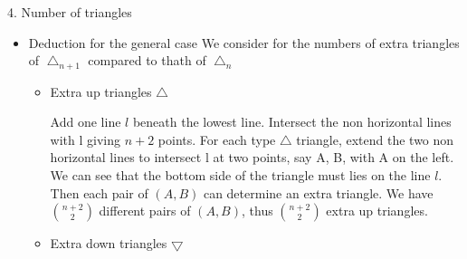 \documentclass{beamer}
\begin{document}
\begin{frame}{4. Number of triangles}
\begin{itemize}
    \item Deduction for the general case
          We consider for the numbers of extra triangles of $\bigtriangleup_{n+1}$ compared to thath of
          $\bigtriangleup_{n}$
          \begin{itemize}
           \item Extra up triangles $\bigtriangleup$
                  \begin{minipage}{0.8\linewidth}
                    Add one line $l$ beneath the lowest line. Intersect the non horizontal
                    lines with l giving $n + 2$ points.
                    For each type $\bigtriangleup$ triangle, extend the two non horizontal
                    lines to intersect l at two points,
                    say A, B, with A on the left.
                    We can see that the bottom side of the triangle must lies on the line $l$. Then each pair of $(A,B)$
                    can determine an extra triangle. We have $\binom{n+2}{2}$ different pairs of $(A,B)$, thus
                    $\binom{n+2}{2}$
                    extra up triangles.
                  \end{minipage}%
                  \begin{minipage}{0.2\linewidth}
                \end{minipage}
             \framebreak
             \item Extra down triangles $\bigtriangledown$ 
                 
             
\begin{minipage}{0.7\linewidth}
                    

\end{minipage}
\end{itemize}
\end{itemize}
\end{frame}
\end{document}

